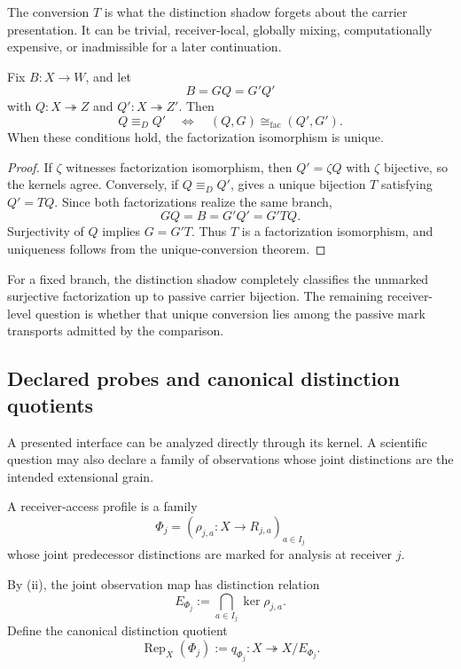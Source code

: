 The conversion $T$ is what the distinction shadow forgets about the carrier presentation. It can be trivial, receiver-local, globally mixing, computationally expensive, or inadmissible for a later continuation.

\begin{theorem}\label{thm:factorization-classification-v14}
Fix $B:X\to W$, and let
\[
B=GQ=G'Q'
\]
with $Q:X\twoheadrightarrow Z$ and $Q':X\twoheadrightarrow Z'$. Then
\[
\boxed{
Q\equiv_DQ'
\quad\Longleftrightarrow\quad
(Q,G)\cong_{\mathrm{fac}}(Q',G').
}
\]
When these conditions hold, the factorization isomorphism is unique.
\end{theorem}

\begin{proof}
If $\zeta$ witnesses factorization isomorphism, then $Q'=\zeta Q$ with $\zeta$ bijective, so the kernels agree. Conversely, if $Q\equiv_DQ'$,  gives a unique bijection $T$ satisfying $Q'=TQ$. Since both factorizations realize the same branch,
\[
GQ=B=G'Q'=G'TQ.
\]
Surjectivity of $Q$ implies $G=G'T$. Thus $T$ is a factorization isomorphism, and uniqueness follows from the unique-conversion theorem.
\end{proof}

For a fixed branch, the distinction shadow completely classifies the unmarked surjective factorization up to passive carrier bijection. The remaining receiver-level question is whether that unique conversion lies among the passive mark transports admitted by the comparison.

\subsection{Declared probes and canonical distinction quotients}

A presented interface can be analyzed directly through its kernel. A scientific question may also declare a family of observations whose joint distinctions are the intended extensional grain.

\begin{definition}\label{def:receiver-access-profile-v13}
A receiver-access profile is a family
\[
\Phi_j=(\rho_{j,a}:X\to R_{j,a})_{a\in I_j}
\]
whose joint predecessor distinctions are marked for analysis at receiver $j$.
\end{definition}

By (ii), the joint observation map has distinction relation
\[
E_{\Phi_j}:=\bigcap_{a\in I_j}\ker\rho_{j,a}.
\]
Define the canonical distinction quotient
\[
\operatorname{Rep}_X(\Phi_j):=q_{\Phi_j}:X\twoheadrightarrow X/E_{\Phi_j}.
\]

